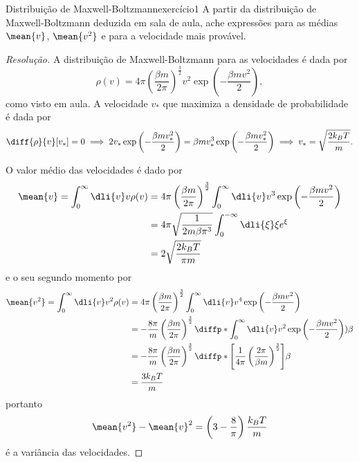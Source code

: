 \begin{exercício}{Distribuição de Maxwell-Boltzmann}{exercício1}
    A partir da distribuição de Maxwell-Boltzmann deduzida em sala de aula, ache expressões para as médias \(\mean{v}\), \(\mean{v^2}\) e para a velocidade mais provável.
\end{exercício}
\begin{proof}[Resolução]
    A distribuição de Maxwell-Boltzmann para as velocidades é dada por
    \begin{equation*}
        \rho(v) = 4\pi \left(\frac{\beta m}{2\pi}\right)^{\frac32} v^2 \exp\left(-\frac{\beta m v^2}{2}\right),
    \end{equation*}
    como visto em aula. A velocidade \(v_*\) que maximiza a densidade de probabilidade é dada por
    \begin{equation*}
        \diff{\rho}{v}[v_*] = 0\implies 2v_* \exp\left(-\frac{\beta mv_*^2}{2}\right) = \beta m v_*^3 \exp\left(-\frac{\beta m v_*^2}{2}\right) \implies v_* = \sqrt{\frac{2k_B T}{m}}.
    \end{equation*}

    O valor médio das velocidades é dado por
    \begin{align*}
        \mean{v} = \int_0^\infty \dli{v} v\rho(v) &= 4\pi \left(\frac{\beta m}{2\pi}\right)^{\frac32} \int_0^\infty \dli{v} v^3 \exp\left(- \frac{\beta m v^2}{2}\right) \\
                                                  &= 4\pi \sqrt{\frac{1}{2m \beta \pi^3}} \int_0^{-\infty}\dli{\xi} \xi e^\xi\\
                                                  &= 2\sqrt{\frac{2k_B T}{\pi m}}
    \end{align*}
    e o seu segundo momento por
    \begin{align*}
        \mean{v^2} = \int_0^\infty \dli{v} v^2\rho(v) &= 4\pi \left(\frac{\beta m}{2\pi}\right)^{\frac32} \int_0^\infty \dli{v} v^4 \exp\left(- \frac{\beta m v^2}{2}\right) \\
                                                      &= -\frac{8\pi}{m} \left(\frac{\beta m}{2\pi}\right)^{\frac32} \diffp*{\int_0^{\infty}\dli{v} v^2 \exp\left(-\frac{\beta m v^2}{2}\right))}{\beta}\\
                                                      &= -\frac{8\pi}{m}\left(\frac{\beta m}{2\pi}\right)^{\frac32}\diffp*{\left[\frac1{4\pi}\left(\frac{2\pi}{\beta m}\right)^{\frac32}\right]}{\beta}\\
                                                      &= \frac{3 k_BT}{m}
    \end{align*}
    portanto
    \begin{equation*}
        \mean{v^2} - \mean{v}^2 = \left(3 - \frac{8}{\pi}\right)\frac{k_B T}{m}
    \end{equation*}
    é a variância das velocidades.
\end{proof}
